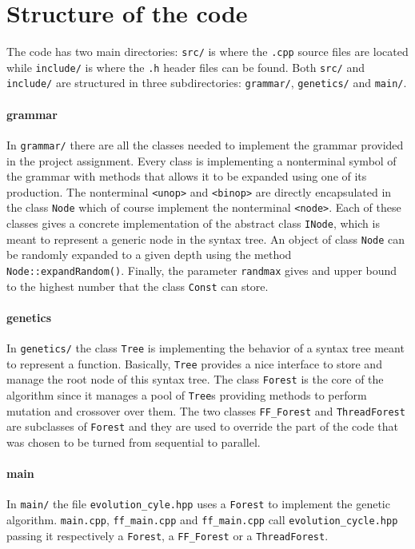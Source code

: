 \documentclass[10pt]{article}
\numberwithin{equation}{section}
\begin{document}
\section{Structure of the code} \label{codestructure}
The code has two main directories: \verb|src/| is where the \verb|.cpp| source files are located while \verb|include/| is where the \verb|.h| header files can be found. Both \verb|src/| and \verb|include/| are structured in three subdirectories: \verb|grammar/|, \verb|genetics/| and \verb|main/|.

\paragraph{grammar}
In \verb|grammar/| there are all the classes needed to implement the grammar provided in the project assignment. Every class is implementing a nonterminal symbol of the grammar with methods that allows it to be expanded using one of its production. The nonterminal \verb|<unop>| and \verb|<binop>| are directly encapsulated in the class \verb|Node| which of course implement the nonterminal \verb|<node>|. Each of these classes gives a concrete implementation of the abstract class \verb|INode|, which is meant to represent a generic node in the syntax tree. An object of class \verb|Node| can be randomly expanded to a given depth using the method \verb|Node::expandRandom()|. Finally, the parameter \verb|randmax| gives and upper bound to the highest number that the class \verb|Const| can store.

\paragraph{genetics}
In \verb|genetics/| the class \verb|Tree| is implementing the behavior of a syntax tree meant to represent a function. Basically, \verb|Tree| provides a nice interface to store and manage the root node of this syntax tree. The class \verb|Forest| is the core of the algorithm since it manages a pool of \verb|Tree|s providing methods to perform mutation and crossover over them. The two classes \verb|FF_Forest| and \verb|ThreadForest| are subclasses of \verb|Forest| and they are used to override the part of the code that was chosen to be turned from sequential to parallel.

\paragraph{main}
In \verb|main/| the file \verb|evolution_cyle.hpp| uses a \verb|Forest| to implement the genetic algorithm. \verb|main.cpp|, \verb|ff_main.cpp| and \verb|ff_main.cpp| call \verb|evolution_cycle.hpp| passing it respectively a \verb|Forest|, a \verb|FF_Forest| or a \verb|ThreadForest|.
\end{document}
